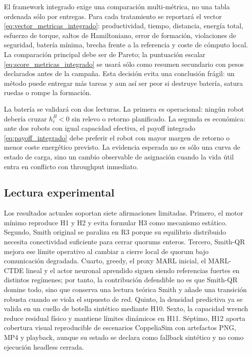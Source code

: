El framework integrado exige una comparación multi-métrica, no una tabla ordenada sólo
por entregas. Para cada tratamiento se reportará el vector
\eqref{eq:vector_metricas_integrado}: productividad, tiempo, distancia, energía total,
esfuerzo de torque, saltos de Hamiltoniano, error de formación, violaciones de seguridad,
batería mínima, brecha frente a la referencia y coste de cómputo local. La comparación
principal debe ser de Pareto; la puntuación escalar \eqref{eq:score_metricas_integrado}
se usará sólo como resumen secundario con pesos declarados antes de la campaña. Esta
decisión evita una conclusión frágil: un método puede entregar más tareas y aun así ser
peor si destruye batería, satura ruedas o rompe la formación.

La batería se validará con dos lecturas. La primera es operacional: ningún robot debería
cruzar $h_i^B<0$ sin relevo o retorno planificado. La segunda es económica: ante dos
robots con igual capacidad efectiva, el payoff integrado \eqref{eq:payoff_integrado}
debe preferir el robot con mayor margen de retorno o menor coste energético previsto. La
evidencia esperada no es sólo una curva de estado de carga, sino un cambio observable de
asignación cuando la vida útil entra en conflicto con throughput inmediato.

\subsection{Lectura experimental}

Los resultados actuales soportan siete afirmaciones limitadas. Primero, el motor mínimo
reproduce H1 y H2 y evita formular H3 como mecanismo estático. Segundo, Smith original se
paraliza en R3 porque su equilibrio distribuido necesita conectividad suficiente para
cerrar quorums enteros. Tercero, Smith-QR mejora ese límite operativo al cambiar a cierre local
de quorum bajo comunicación degradada. Cuarto, greedy, el proxy MARL inicial, el
MARL-CTDE lineal y el actor neuronal aprendido siguen siendo referencias fuertes en distintos regímenes; por tanto,
la contribución defendible no es que Smith-QR domine todo, sino que conserva una lectura
teórica Smith y añade una transición robusta cuando se viola el supuesto de red. Quinto,
la densidad predictiva ya se valida en un cuello de botella sintético mediante H10.
Sexto, la capacidad wrench reduce residual físico y mantiene límites dinámicos en H11.
Séptimo, H12 aporta cobertura visual reproducible de escenarios CoppeliaSim con artefactos
PNG, MP4 y playback, aunque su estado se declara como fallback sintético y no como
ejecución headless cerrada.
